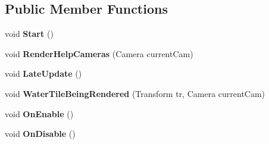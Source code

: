 \subsection*{Public Member Functions}
\begin{DoxyCompactItemize}
\item 
void {\bfseries Start} ()\hypertarget{class_unity_standard_assets_1_1_water_1_1_planar_reflection_a47f6a478dc5d988c681479d0a96f3baf}{}\label{class_unity_standard_assets_1_1_water_1_1_planar_reflection_a47f6a478dc5d988c681479d0a96f3baf}

\item 
void {\bfseries Render\+Help\+Cameras} (Camera current\+Cam)\hypertarget{class_unity_standard_assets_1_1_water_1_1_planar_reflection_a8c8136a0d00227f4d93ce7e6a9676eac}{}\label{class_unity_standard_assets_1_1_water_1_1_planar_reflection_a8c8136a0d00227f4d93ce7e6a9676eac}

\item 
void {\bfseries Late\+Update} ()\hypertarget{class_unity_standard_assets_1_1_water_1_1_planar_reflection_a38cee17bffa51b0c7c6ab009b7db80d2}{}\label{class_unity_standard_assets_1_1_water_1_1_planar_reflection_a38cee17bffa51b0c7c6ab009b7db80d2}

\item 
void {\bfseries Water\+Tile\+Being\+Rendered} (Transform tr, Camera current\+Cam)\hypertarget{class_unity_standard_assets_1_1_water_1_1_planar_reflection_a0dc504b4e5d267a4ffb2b5227689f8da}{}\label{class_unity_standard_assets_1_1_water_1_1_planar_reflection_a0dc504b4e5d267a4ffb2b5227689f8da}

\item 
void {\bfseries On\+Enable} ()\hypertarget{class_unity_standard_assets_1_1_water_1_1_planar_reflection_accfcd0dc698ac707a734e922fa9ab43f}{}\label{class_unity_standard_assets_1_1_water_1_1_planar_reflection_accfcd0dc698ac707a734e922fa9ab43f}

\item 
void {\bfseries On\+Disable} ()\hypertarget{class_unity_standard_assets_1_1_water_1_1_planar_reflection_a06d5a20a07678c0cc1fd4face77a08f9}{}\label{class_unity_standard_assets_1_1_water_1_1_planar_reflection_a06d5a20a07678c0cc1fd4face77a08f9}

\end{DoxyCompactItemize}
